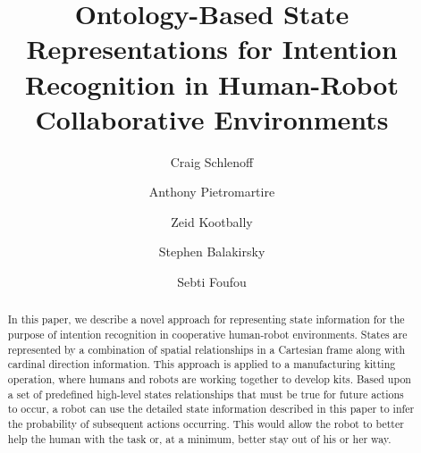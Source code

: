 \documentclass[preprint,12pt]{elsarticle}
\begin{document}
\begin{frontmatter}



\title{Ontology-Based State Representations for Intention Recognition in Human-Robot Collaborative Environments}

 \author[nist,le2i]{Craig Schlenoff}

 \author[nist]{Anthony Pietromartire}

 \author[umd]{Zeid Kootbally}

 \author[nist]{Stephen Balakirsky}

 \author[qatar,le2i]{Sebti Foufou}

 \address[nist]{National Institute of Standards and Technology (NIST), 100 Bureau Drive, Stop 8230, Gaithersburg MD 20899 USA}
 \address[le2i]{University of Burgundy, LE2i Lab, Dijon, France}
 \address[qatar]{Computer Science and Engineering Department Qatar University, Doha Qatar}
 \address[umd]{University of Maryland, Department of Mechanical Engineering, College Park MD 20742 USA}


\begin{abstract}
In this paper, we describe a novel approach for representing state information for the purpose of intention recognition in cooperative human-robot environments. States are represented by a combination of spatial relationships in a Cartesian frame along with cardinal direction information. This approach is applied to a manufacturing kitting operation, where humans and robots are working together to develop kits. Based upon a set of predefined high-level states relationships that must be true for future actions to occur, a robot can use the detailed state information described in this paper to infer the probability of subsequent actions occurring. This would allow the robot to better help the human with the task or, at a minimum, better stay out of his or her way.
\end{abstract}


\end{frontmatter}
\end{document}
